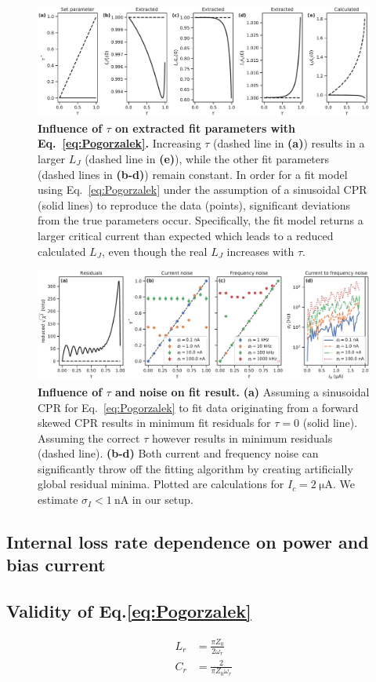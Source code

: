 \begin{figure}
	\centering
	\includegraphics[width=\linewidth]{chapter-gJJ-CPR/figs/SMFigure-tauparams}
	\caption{
		\textbf{Influence of $\tau$ on extracted fit parameters with Eq.~\ref{eq:Pogorzalek}.}
		Increasing $\tau$ (dashed line in \textbf{(a)}) results in a larger $L_J$ (dashed line in \textbf{(e)}), while the other fit parameters (dashed lines in \textbf{(b-d)}) remain constant.
		In order for a fit model using Eq.~\ref{eq:Pogorzalek} under the assumption of a sinusoidal CPR (solid lines) to reproduce the data (points), significant deviations from the true parameters occur.
		Specifically, the fit model returns a larger critical current than expected which leads to a reduced calculated $L_J$, even though the real $L_J$ increases with $\tau$.
	}
	\label{fig:SMtau}
\end{figure}

\begin{figure}
	\centering
	\includegraphics[width=\linewidth]{chapter-gJJ-CPR/figs/SMFigure-noise}
	\caption{
		\textbf{Influence of $\tau$ and noise on fit result.}
		\textbf{(a)} Assuming a sinusoidal CPR for Eq.~\ref{eq:Pogorzalek} to fit data originating from a forward skewed CPR results in minimum fit residuals for $\tau=0$ (solid line).
		Assuming the correct $\tau$ however results in minimum residuals (dashed line).
		\textbf{(b-d)} Both current and frequency noise can significantly throw off the fitting algorithm by creating artificially global residual minima.
		Plotted are calculations for $I_c=\SI{2}{\micro\ampere}$.
		We estimate $\sigma_I<\SI{1}{\nano\ampere}$ in our setup.
	}
	\label{fig:SMres}
\end{figure}

\subsection{Internal loss rate dependence on power and bias current}

\subsection{Validity of Eq.\ref{eq:Pogorzalek}}

\begin{align}
L_r &= \frac{\pi Z_0}{2\omega_r} \\
C_r &= \frac{2}{\pi Z_0 \omega_r}
\end{align}


